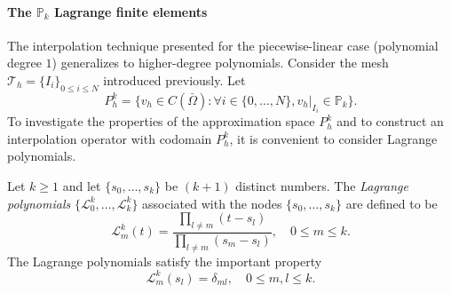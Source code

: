 \paragraph{The $\mathbb{P}_k$ Lagrange finite elements}
The interpolation technique presented for the piecewise-linear case (polynomial degree $1$) generalizes to higher-degree polynomials. Consider the mesh $\mathcal{T}_h = \{I_i\}_{0 \le i \le N}$ introduced previously. Let
\begin{equation}\label{eq:def-Phk}
    P_h^k = \{ v_h \in C(\bar{\Omega}): \forall i \in \{0, \dots, N\}, v_h|_{I_i} \in \mathbb{P}_k \}.
\end{equation}
To investigate the properties of the approximation space $P_h^k$ and to construct an interpolation operator with codomain $P_h^k$, it is convenient to consider Lagrange polynomials.
\begin{definition}\label{def:lagrange-polynomials}
    Let $k \ge 1$ and let $\{s_0, \dots, s_k\}$ be $(k+1)$ distinct numbers. The \emph{Lagrange polynomials} $\{\mathcal{L}_0^k, \dots, \mathcal{L}_k^k\}$ associated with the nodes $\{s_0, \dots, s_k\}$ are defined to be
    \begin{equation}
        \mathcal{L}_m^k(t) = \frac{\prod_{l \ne m}(t - s_l)}{\prod_{l \ne m}(s_m - s_l)}, \quad 0 \le m \le k.
    \end{equation}
    The Lagrange polynomials satisfy the important property
    \begin{equation}
        \mathcal{L}_m^k(s_l) = \delta_{ml}, \quad 0 \le m,l \le k.
    \end{equation}
\end{definition}

